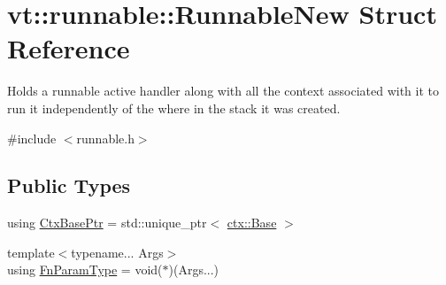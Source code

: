 \hypertarget{structvt_1_1runnable_1_1_runnable_new}{}\section{vt\+:\+:runnable\+:\+:Runnable\+New Struct Reference}
\label{structvt_1_1runnable_1_1_runnable_new}


Holds a runnable active handler along with all the context associated with it to run it independently of the where in the stack it was created.  




{\ttfamily \#include $<$runnable.\+h$>$}

\subsection*{Public Types}
\begin{DoxyCompactItemize}
\item 
using \hyperlink{structvt_1_1runnable_1_1_runnable_new_aba3112ca6cb024a32552569ef0571e20}{Ctx\+Base\+Ptr} = std\+::unique\+\_\+ptr$<$ \hyperlink{structvt_1_1ctx_1_1_base}{ctx\+::\+Base} $>$
\item 
{\footnotesize template$<$typename... Args$>$ }\\using \hyperlink{structvt_1_1runnable_1_1_runnable_new_a591a5eaee30eea99711e14e050633d34}{Fn\+Param\+Type} = void($\ast$)(Args...)
\end{DoxyCompactItemize}
